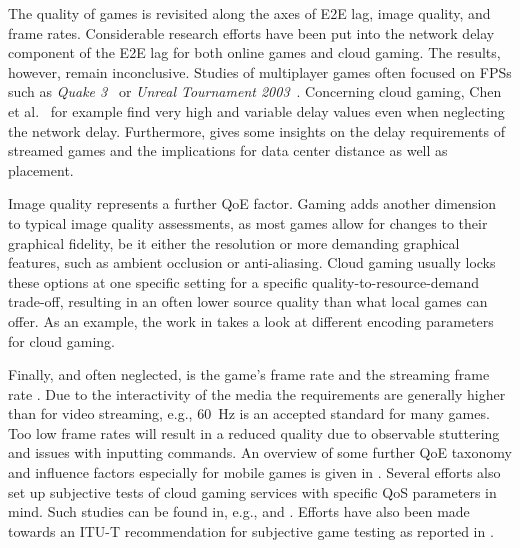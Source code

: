 The quality of games is revisited along the axes of \gls{E2E} lag, image quality, and frame rates.
Considerable research efforts have been put into the network delay component of the \gls{E2E} lag for both online games and cloud gaming. The results, however, remain inconclusive. Studies of multiplayer games often focused on \glspl{FPS} such as \textit{Quake 3}~\cite{1266180} or \textit{Unreal Tournament 2003}~\cite{Beigbeder:2004:ELL:1016540.1016556}. Concerning cloud gaming, Chen et al.~\cite{6670099} for example find very high and variable delay values even when neglecting the network delay. Furthermore, \cite{Choy:2012:BSC:2501560.2501563} gives some insights on the delay requirements of streamed games and the implications for data center distance as well as placement.

Image quality represents a further \gls{QoE} factor. Gaming adds another dimension to typical image quality assessments, as most games allow for changes to their graphical fidelity, be it either the resolution or more demanding graphical features, such as ambient occlusion or anti-aliasing. Cloud gaming usually locks these options at one specific setting for a specific quality-to-resource-demand trade-off, resulting in an often lower source quality than what local games can offer. As an example, the work in \cite{slivarimpact} takes a look at different encoding parameters for cloud gaming.

Finally, and often neglected, is the game's frame rate and the streaming frame rate \cite{metzger2016gamesframes,Metzger2016}. Due to the interactivity of the media the requirements are generally higher than for video streaming, e.g., \SI{60}{\hertz} is an accepted standard for many games. Too low frame rates will result in a reduced quality due to observable stuttering and issues with inputting commands.
An overview of some further \gls{QoE} taxonomy and influence factors especially for mobile games is given in \cite{beyer2014typedisplaydelayimpact}. Several efforts also set up subjective tests of cloud gaming services with specific \gls{QoS} parameters in mind. Such studies can be found in, e.g., \cite{Jarschel20132883} and  \cite{6614351}. Efforts have also been made towards an \acrshort{ITU-T} recommendation for subjective game testing as reported in \cite{mollertowards}.

